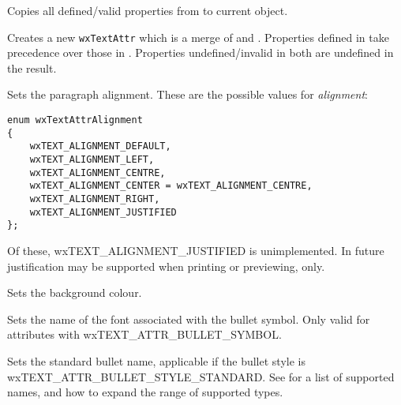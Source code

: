 
Copies all defined/valid properties from  to current object.


Creates a new {\tt wxTextAttr} which is a merge of  and 
. Properties defined in  take precedence over those
in . Properties undefined/invalid in both are undefined in the
result.


\label{wxtextattrsetalignment}


Sets the paragraph alignment. These are the possible values for {\it alignment}:

{\small
\begin{verbatim}
enum wxTextAttrAlignment
{
    wxTEXT_ALIGNMENT_DEFAULT,
    wxTEXT_ALIGNMENT_LEFT,
    wxTEXT_ALIGNMENT_CENTRE,
    wxTEXT_ALIGNMENT_CENTER = wxTEXT_ALIGNMENT_CENTRE,
    wxTEXT_ALIGNMENT_RIGHT,
    wxTEXT_ALIGNMENT_JUSTIFIED
};
\end{verbatim}
}

Of these, wxTEXT\_ALIGNMENT\_JUSTIFIED is unimplemented. In future justification may be supported
when printing or previewing, only.

\label{wxtextattrsetbackgroundcolour}


Sets the background colour.

\label{wxtextattrsetbulletfont}


Sets the name of the font associated with the bullet symbol.
Only valid for attributes with wxTEXT\_ATTR\_BULLET\_SYMBOL.

\label{wxtextattrsetbulletname}


Sets the standard bullet name, applicable if the bullet style is wxTEXT\_ATTR\_BULLET\_STYLE\_STANDARD.
See  for a list
of supported names, and how to expand the range of supported types.

